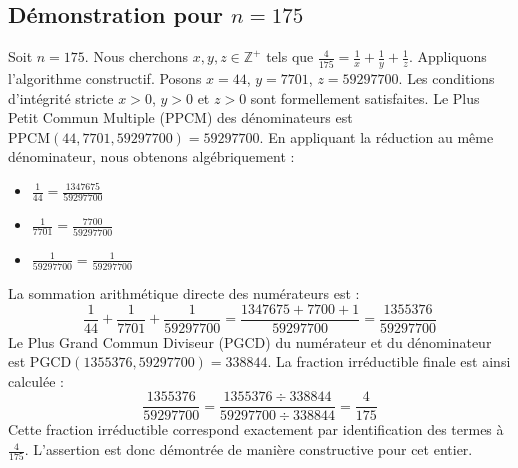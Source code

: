 \documentclass[11pt,a4paper]{article}
\begin{document}
\subsection{Démonstration pour $n = 175$}
Soit $n = 175$. Nous cherchons $x, y, z \in \mathbb{Z}^{+}$ tels que $\frac{4}{175} = \frac{1}{x} + \frac{1}{y} + \frac{1}{z}$.
Appliquons l'algorithme constructif. Posons $x = 44$, $y = 7701$, $z = 59297700$.
Les conditions d'intégrité stricte $x > 0$, $y > 0$ et $z > 0$ sont formellement satisfaites.
Le Plus Petit Commun Multiple (PPCM) des dénominateurs est $\text{PPCM}(44, 7701, 59297700) = 59297700$.
En appliquant la réduction au même dénominateur, nous obtenons algébriquement :
\begin{itemize}
    \item $\frac{1}{44} = \frac{1347675}{59297700}$
    \item $\frac{1}{7701} = \frac{7700}{59297700}$
    \item $\frac{1}{59297700} = \frac{1}{59297700}$
\end{itemize}
La sommation arithmétique directe des numérateurs est :
$$ \frac{1}{44} + \frac{1}{7701} + \frac{1}{59297700} = \frac{1347675 + 7700 + 1}{59297700} = \frac{1355376}{59297700} $$
Le Plus Grand Commun Diviseur (PGCD) du numérateur et du dénominateur est $\text{PGCD}(1355376, 59297700) = 338844$.
La fraction irréductible finale est ainsi calculée :
$$ \frac{1355376}{59297700} = \frac{1355376 \div 338844}{59297700 \div 338844} = \frac{4}{175} $$
Cette fraction irréductible correspond exactement par identification des termes à $\frac{4}{175}$. L'assertion est donc démontrée de manière constructive pour cet entier.
\end{document}

